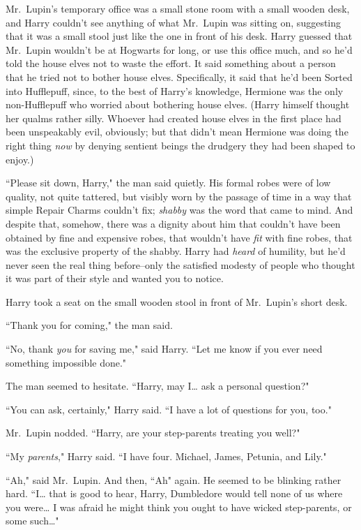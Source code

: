 \later

Mr.~Lupin's temporary office was a small stone room with a small wooden desk, and Harry couldn't see anything of what Mr.~Lupin was sitting on, suggesting that it was a small stool just like the one in front of his desk. Harry guessed that Mr.~Lupin wouldn't be at Hogwarts for long, or use this office much, and so he'd told the house elves not to waste the effort. It said something about a person that he tried not to bother house elves. Specifically, it said that he'd been Sorted into Hufflepuff, since, to the best of Harry's knowledge, Hermione was the only non-Hufflepuff who worried about bothering house elves. (Harry himself thought her qualms rather silly. Whoever had created house elves in the first place had been unspeakably evil, obviously; but that didn't mean Hermione was doing the right thing \emph{now} by denying sentient beings the drudgery they had been shaped to enjoy.)

``Please sit down, Harry," the man said quietly. His formal robes were of low quality, not quite tattered, but visibly worn by the passage of time in a way that simple Repair Charms couldn't fix; \emph{shabby} was the word that came to mind. And despite that, somehow, there was a dignity about him that couldn't have been obtained by fine and expensive robes, that wouldn't have \emph{fit} with fine robes, that was the exclusive property of the shabby. Harry had \emph{heard} of humility, but he'd never seen the real thing before\---only the satisfied modesty of people who thought it was part of their style and wanted you to notice.

Harry took a seat on the small wooden stool in front of Mr.~Lupin's short desk.

``Thank you for coming," the man said.

``No, thank \emph{you} for saving me," said Harry. ``Let me know if you ever need something impossible done."

The man seemed to hesitate. ``Harry, may I{\ldots} ask a personal question?"

``You can ask, certainly," Harry said. ``I have a lot of questions for you, too."

Mr.~Lupin nodded. ``Harry, are your step-parents treating you well?"

``My \emph{parents}," Harry said. ``I have four. Michael, James, Petunia, and Lily."

``Ah," said Mr.~Lupin. And then, ``Ah" again. He seemed to be blinking rather hard. ``I{\ldots} that is good to hear, Harry, Dumbledore would tell none of us where you were{\ldots} I was afraid he might think you ought to have wicked step-parents, or some such{\ldots}"

